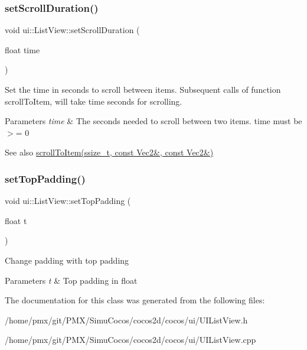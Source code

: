 \subsubsection{\texorpdfstring{set\+Scroll\+Duration()}{setScrollDuration()}\hspace{0.1cm}{\footnotesize\ttfamily [2/2]}}
{\footnotesize\ttfamily void ui\+::\+List\+View\+::set\+Scroll\+Duration (\begin{DoxyParamCaption}\item[{float}]{time }\end{DoxyParamCaption})}

Set the time in seconds to scroll between items. Subsequent calls of function \textquotesingle{}scroll\+To\+Item\textquotesingle{}, will take \textquotesingle{}time\textquotesingle{} seconds for scrolling. 
\begin{DoxyParams}{Parameters}
{\em time} & The seconds needed to scroll between two items. \textquotesingle{}time\textquotesingle{} must be $>$= 0 \\
\hline
\end{DoxyParams}
\begin{DoxySeeAlso}{See also}
\hyperlink{classui_1_1ListView_aeb284de1ebb4ae2e30c6c478d6e1d1a0}{scroll\+To\+Item(ssize\+\_\+t, const Vec2\&, const Vec2\&)} 
\end{DoxySeeAlso}
\mbox{\label{classui_1_1ListView_aeb8a524c2ba33a74b77267b7815bd949}} 
\subsubsection{\texorpdfstring{set\+Top\+Padding()}{setTopPadding()}}
{\footnotesize\ttfamily void ui\+::\+List\+View\+::set\+Top\+Padding (\begin{DoxyParamCaption}\item[{float}]{t }\end{DoxyParamCaption})}

Change padding with top padding 
\begin{DoxyParams}{Parameters}
{\em t} & Top padding in float \\
\hline
\end{DoxyParams}


The documentation for this class was generated from the following files\+:\begin{DoxyCompactItemize}
\item 
/home/pmx/git/\+P\+M\+X/\+Simu\+Cocos/cocos2d/cocos/ui/U\+I\+List\+View.\+h\item 
/home/pmx/git/\+P\+M\+X/\+Simu\+Cocos/cocos2d/cocos/ui/U\+I\+List\+View.\+cpp\end{DoxyCompactItemize}
